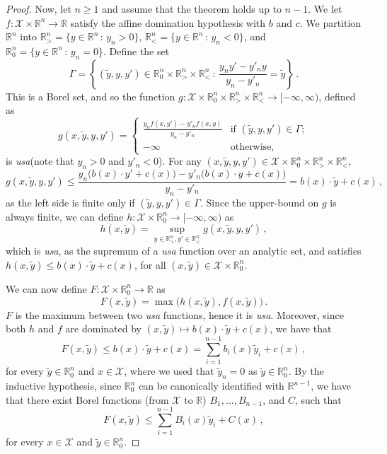 \documentclass[10pt, a4paper]{article}
\newcommand{\R}{\mathbb R}
\newcommand{\usa}{\emph{usa}\xspace}
\newcommand{\X}{\mathcal X}
\begin{document}
\begin{proof}
    Now, let $n\geq 1$ and assume that the theorem holds up to $n-1$. We let $f:\X\times \R^n\to\R$  satisfy the affine domination hypothesis with $b$ and $c$.  
    We partition $\R^n$ into $\R^n_> = \{y\in \R^n\,:\,y_n>0\}$, $\R^n_<=\{y\in \R^n\,:\,y_n<0\}$, and $\R^n_0 = \{y\in \R^n\,:\,y_n=0\}$. Define the set 
    $$\Gamma = \left\{(\tilde y, y, y')\in \R^n_0\times \R^n_>\times \R^n_<\,:\,\frac{y_{n} y' - y'_{n} y}{y_{n}-y'_{n}} = \tilde y\right\}\,.$$ This is a Borel set, and so the function $g:\X\times \R^n_0\times \R^n_>\times \R^n_<\to[-\infty,\infty)$, defined as 
    $$g(x,\tilde y, y, y') = \begin{cases}
    \frac{y_{n}f(x,y') - y'_{n}f(x,y)}{y_{n}-y'_{n}} & \text{if $(\tilde y, y, y')\in\Gamma$};\\-\infty & \text{otherwise,}\end{cases}$$
    is \usa (note that $y_{n}>0$ and $y'_{n}<0$). For any $(x, \tilde y, y, y')\in \X\times \R^n_0\times \R^n_>\times \R^n_<$,$$g(x, \tilde y, y, y') \leq \frac{y_{n}  \big(b(x)\cdot y'+c(x)\big) - y'_{n} \big(b(x)\cdot y+c(x)\big)}{y_{n}-y'_{n}} =   b(x) \cdot\tilde y + c(x)\,,$$  as the left side is finite only if $(\tilde y, y,y')\in\Gamma$. Since the upper-bound on $g$ is always finite, we can define $h:\X\times \R^n_0\to[-\infty,\infty)$ as  
    $$h(x,\tilde y) = \sup_{y\in \R^n_>,y'\in \R^n_<} g(x, \tilde y, y, y')\,,$$ 
    which is \usa, as the supremum of a \usa function over an analytic set, and satisfies $h(x,\tilde y)\leq b(x)\cdot \tilde y + c(x)$, for all $(x,\tilde y)\in\X\times \R^n_0$.

    We can now define $F:\X\times \R^n_0\to \R$ as
    $$F(x, \tilde y) = \max\big(h(x,\tilde y),f(x,\tilde y)\big)\,.$$ $F$ is the maximum between two \usa functions, hence it is \usa. Moreover, since both $h$ and $f$ are dominated by $(x,\tilde y)\mapsto b(x)\cdot\tilde y + c(x)$, we have that
    $$F(x,\tilde y) \leq b(x)\cdot \tilde y + c(x) = \sum_{i=1}^{n-1} b_i(x)\tilde y_i + c(x)\,,$$ for every $\tilde y\in \R^n_0$ and $x\in\X$, where we used that $\tilde y_{n} = 0$ as $\tilde y\in \R^n_0$. By the inductive hypothesis, since  $\R^n_0$ can be canonically identified with  $\R^{n-1}$, we have that there exist Borel functions (from $\X$ to $\R$) $B_1,\dots, B_{n-1}$, and $C$, such that
    $$F(x, \tilde y) \leq \sum_{i=1}^{n-1} B_i(x)\tilde y_i + C(x)\,,$$
    for every $x\in\X$ and $\tilde y\in \R^n_0$. 


\end{proof}
\end{document}
